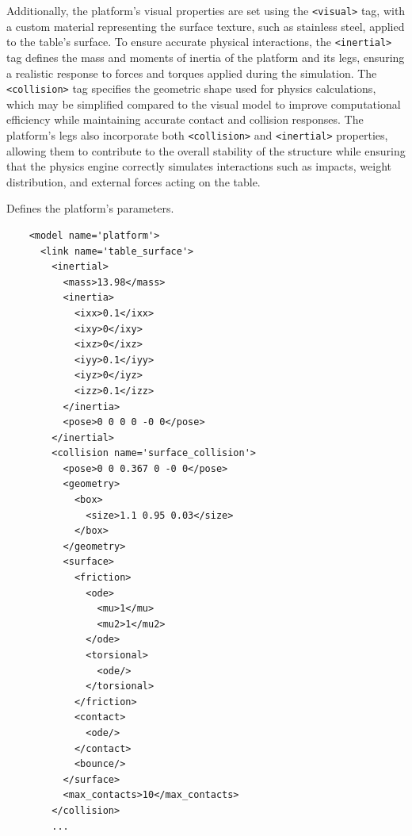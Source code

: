 \documentclass[../../main]{subfiles}
\begin{document}
Additionally, the platform’s visual properties are set using the \texttt{<visual>} tag, 
with a custom material representing the surface texture, such as stainless steel, applied to the table’s surface.  
To ensure accurate physical interactions, the \texttt{<inertial>} tag defines the mass and moments of inertia of the 
platform and its legs, ensuring a realistic response to forces and torques applied during the simulation.  
The \texttt{<collision>} tag specifies the geometric shape used for physics calculations, which may be simplified 
compared to the visual model to improve computational efficiency while maintaining accurate contact and 
collision responses. The platform's legs also incorporate both \texttt{<collision>} and \texttt{<inertial>} properties, 
allowing them to contribute to the overall stability of the structure while ensuring that the physics engine correctly 
simulates interactions such as impacts, weight distribution, and external forces acting on the table.  
\begin{codebox}[]{Defines the platform’s parameters.}
  
  \begin{verbatim}
    <model name='platform'>
      <link name='table_surface'>
        <inertial>
          <mass>13.98</mass>
          <inertia>
            <ixx>0.1</ixx>
            <ixy>0</ixy>
            <ixz>0</ixz>
            <iyy>0.1</iyy>
            <iyz>0</iyz>
            <izz>0.1</izz>
          </inertia>
          <pose>0 0 0 0 -0 0</pose>
        </inertial>
        <collision name='surface_collision'>
          <pose>0 0 0.367 0 -0 0</pose>
          <geometry>
            <box>
              <size>1.1 0.95 0.03</size>
            </box>
          </geometry>
          <surface>
            <friction>
              <ode>
                <mu>1</mu>
                <mu2>1</mu2>
              </ode>
              <torsional>
                <ode/>
              </torsional>
            </friction>
            <contact>
              <ode/>
            </contact>
            <bounce/>
          </surface>
          <max_contacts>10</max_contacts>
        </collision>
        ...
\end{verbatim}
\end{codebox}
\end{document}
